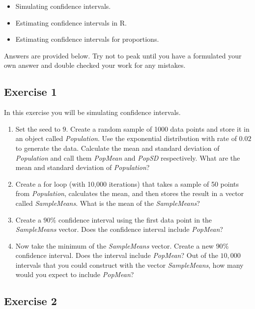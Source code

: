 \documentclass[
  letterpaper,
  DIV=11,
  numbers=noendperiod]{scrreprt}
\begin{document}
\begin{itemize}
\item
  Simulating confidence intervals.
\item
  Estimating confidence intervals in R.
\item
  Estimating confidence intervals for proportions.
\end{itemize}

Answers are provided below. Try not to peak until you have a formulated
your own answer and double checked your work for any mistakes.

\hypertarget{exercise-1-22}{%
\subsection*{Exercise 1}\label{exercise-1-22}}

In this exercise you will be simulating confidence intervals.

\begin{enumerate}
\def\labelenumi{\arabic{enumi}.}
\item
  Set the seed to \(9\). Create a random sample of 1000 data points and
  store it in an object called \emph{Population}. Use the exponential
  distribution with rate of \(0.02\) to generate the data. Calculate the
  mean and standard deviation of \emph{Population} and call them
  \emph{PopMean} and \emph{PopSD} respectively. What are the mean and
  standard deviation of \emph{Population}?
\item
  Create a for loop (with 10,000 iterations) that takes a sample of 50
  points from \emph{Population}, calculates the mean, and then stores
  the result in a vector called \emph{SampleMeans}. What is the mean of
  the \emph{SampleMeans}?
\item
  Create a \(90\)\% confidence interval using the first data point in
  the \emph{SampleMeans} vector. Does the confidence interval include
  \emph{PopMean}?
\item
  Now take the minimum of the \emph{SampleMeans} vector. Create a new
  \(90\)\% confidence interval. Does the interval include
  \emph{PopMean}? Out of the \(10,000\) intervals that you could
  construct with the vector \emph{SampleMeans}, how many would you
  expect to include \emph{PopMean}?
\end{enumerate}

\hypertarget{exercise-2-22}{%
\subsection*{Exercise 2}\label{exercise-2-22}}
\end{document}
